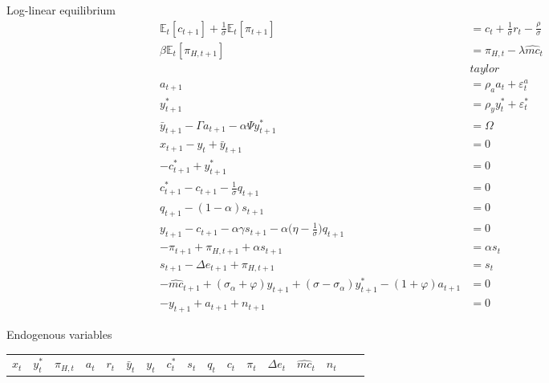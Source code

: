 \documentclass{article}
\newcommand{\Et}{\mathbb{E}_t}
\begin{document}
Log-linear equilibrium\\

\begin{subequations}
\begin{align}
    \Et[c_{t+1}] + \frac{1}{\sigma} \Et[\pi_{t+1}] & = c_t + \frac{1}{\sigma}r_t - \frac{\rho}{\sigma} \\
    \beta \Et[\pi_{H,t+1}] & = \pi_{H,t} - \lambda \hat{mc}_t  \\
    & taylor \\
    a_{t+1} & = \rho_a a_t + \varepsilon^a_t\\
    y^*_{t+1} & = \rho_y y_t^* + \varepsilon^*_t\\
    \bar y_{t+1} - \Gamma a_{t+1} - \alpha \Psi y^*_{t+1} & = \Omega\\
    x_{t+1} - y_t + \bar y_{t+1} & = 0\\
    -c^*_{t+1} +y^*_{t+1} & = 0\\
    c^*_{t+1} - c_{t+1} - \frac{1}{\sigma} q_{t+1} & = 0\\
    q_{t+1} - (1 - \alpha) s_{t+1} & = 0\\
    y_{t+1} - c_{t+1} - \alpha \gamma s_{t+1} - \alpha \bigg(\eta - \frac{1}{\sigma} \bigg) q_{t+1} & = 0\\
    -\pi_{t+1} + \pi_{H,t+1} + \alpha s_{t+1} & = \alpha s_t\\
    s_{t+1} - \Delta e_{t+1} + \pi_{H,t+1} & = s_t\\
    -\hat{mc}_{t+1} + (\sigma_\alpha + \varphi) y_{t+1} + (\sigma - \sigma_\alpha) y_{t+1}^* - (1+\varphi) a_{t+1} & =0\\
    -y_{t+1} + a_{t+1} + n_{t+1} & = 0
\end{align}
\end{subequations}

Endogenous variables\\
\begin{tabular}{ccccccccccccccccc} $x_t$ & $y_t^*$ & $\pi_{H,t}$ & $a_t$ & $r_t$ & $\bar y_t$ & $y_t$ & $c_t^*$ & $s_t$ & $q_t$ & $c_t$ & $\pi_t$ & $\Delta e_t$ & $\hat{mc}_t$ & $n_t$ \end{tabular}\\
\end{document}
